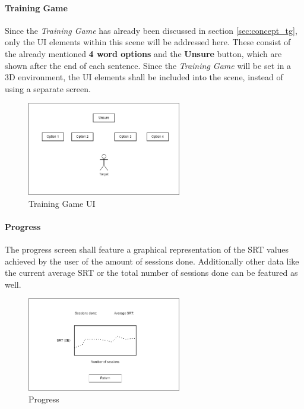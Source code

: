 \documentclass[a4paper,11pt]{article}%
\renewcommand{\\}{\vspace*{0.5\baselineskip} \newline}
\begin{document}
\paragraph{Training Game} Since the \textit{Training Game} has already been discussed in section \ref{sec:concept_tg}, only the \acs{UI} elements within this scene will be addressed here. These consist of the already mentioned \textbf{4 word options} and the \textbf{Unsure} button, which are shown after the end of each sentence. Since the \textit{Training Game} will be set in a 3D environment, the \acs{UI} elements shall be included into the scene, instead of using a separate screen.
\vspace{5mm}
\begin{figure}[h!]
\centering
\includegraphics[width=0.6\textwidth]{TrainingGame.png}
\caption{Training Game UI}
\label{fig:mainmenu}
\vspace{3mm}
\end{figure}

\paragraph{Progress} The progress screen shall feature a graphical representation of the \ac{SRT} values achieved by the user of the amount of sessions done. Additionally other data like the current average \ac{SRT} or the total number of sessions done can be featured as well.
\begin{figure}[h!]
\centering
\includegraphics[width=0.6\textwidth]{Progress.png}
\caption{Progress}
\label{fig:progress}
\vspace{3mm}
\end{figure}
\end{document}
